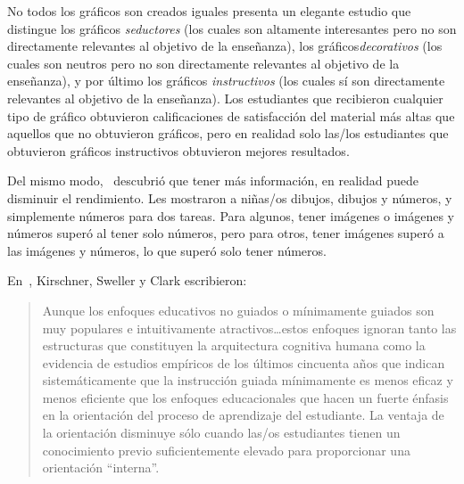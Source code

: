 \begin{aside}{No todos los gráficos son creados iguales}
  \cite{Sung2012} presenta un elegante estudio que distingue los gráficos \emph{seductores}
  (los cuales son altamente interesantes pero no son directamente relevantes al objetivo de la enseñanza),
  los gráficos\emph{decorativos}
  (los cuales son neutros pero no son directamente relevantes al objetivo de la enseñanza),
  y por último
  los gráficos \emph{instructivos}
  (los cuales sí son directamente relevantes al objetivo de la enseñanza).
  Los estudiantes que recibieron cualquier tipo de gráfico obtuvieron calificaciones de satisfacción
  del material más altas que aquellos que no obtuvieron gráficos,
  pero en realidad solo las/los estudiantes que obtuvieron gráficos instructivos obtuvieron mejores resultados.


  Del mismo modo,~\cite{Stam2013,Stam2014} descubrió que
  tener más información, en realidad puede disminuir el rendimiento.
  Les mostraron a  niñas/os dibujos, dibujos y números, y simplemente números
  para dos tareas.
  Para algunos, tener imágenes o imágenes y números superó al tener solo números,
  pero para otros, tener imágenes superó a las imágenes y números,
  lo que superó solo tener números.
\end{aside}


En~\cite{Kirs2006}, Kirschner, Sweller y Clark escribieron:

\begin{quote}
 
  Aunque los enfoques educativos no guiados o mínimamente guiados son muy    
  populares e intuitivamente atractivos{\ldots}estos enfoques ignoran tanto
  las estructuras que constituyen la arquitectura cognitiva humana como
  la evidencia de estudios empíricos de los últimos cincuenta años que indican
  sistemáticamente que la instrucción guiada mínimamente es menos eficaz y
  menos eficiente que los enfoques educacionales que hacen un fuerte énfasis
  en la orientación del proceso de aprendizaje del estudiante.
  La ventaja de la orientación disminuye sólo cuando las/os estudiantes
  tienen un conocimiento previo suficientemente elevado para proporcionar una orientación ``interna''.
\end{quote}

